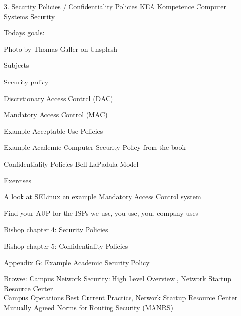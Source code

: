\documentclass[Screen16to9,17pt]{foils}
\begin{document}
\mytitlepage
{3. Security Policies / Confidentiality Policies}
{KEA Kompetence Computer Systems Security \the\year}



Todays goals:
\begin{list2}
\item
\end{list2}

  Photo by Thomas Galler on Unsplash
  

\begin{list1}
\item Subjects
\begin{list2}
  \item Security policy
  \item Discretionary Access Control (DAC)
  \item Mandatory Access Control (MAC)
  \item Example Acceptable Use Policies
  \item Example Academic Computer Security Policy from the book
  \item Confidentiality Policies Bell-LaPadula Model
\end{list2}
\item Exercises
\begin{list2}
\item A look at SELinux an example Mandatory Access Control system
\item Find your AUP for the ISPs we use, you use, your company uses
\end{list2}
\end{list1}


\begin{list1}
\item Bishop chapter 4: Security Policies
\item Bishop chapter 5: Confidentiality Policies
\item Appendix G: Example Academic Security Policy
\item Browse: Campus Network Security: High Level Overview , Network Startup Resource Center\\
Campus Operations Best Current Practice, Network Startup Resource Center\\
Mutually Agreed Norms for Routing Security (MANRS)
\end{list1}
\end{document}
